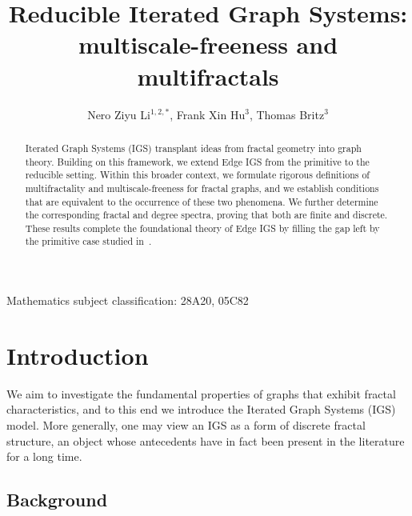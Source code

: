 \documentclass[12pt]{iopart}
\begin{document}
\title[Reducible Iterated Graph Systems]{Reducible Iterated Graph Systems: \\
multiscale-freeness and multifractals}

\author{Nero Ziyu Li$^{1,2,*}$, Frank Xin Hu$^3$, Thomas Britz$^3$}
\address{$^1$ 
Department of Mathematics,
Imperial College London, United Kingdom}
\address{$^2$ CDT Random Systems, University of Oxford, United Kingdom}
\address{$^3$ School of Mathematics and Statistics, UNSW Sydney, Australia}
\address{$^*$ Author to whom any correspondence should be addressed.}


\vspace{0.2cm}\hspace{1.7cm}\small{Mathematics subject classification: 28A20, 05C82}

\begin{abstract}
Iterated Graph Systems (IGS) transplant ideas from fractal geometry into graph theory. 
Building on this framework, we extend Edge IGS from the primitive to the reducible setting. 
Within this broader context, we formulate rigorous definitions of 
multifractality and multiscale-freeness for { fractal graphs}, 
and we establish conditions that are equivalent to the occurrence of these two phenomena. 
We further determine the corresponding fractal and degree spectra, 
proving that both are finite and discrete. 
These results complete the foundational theory of Edge IGS 
by filling the gap left by the primitive case studied in~\cite{li2024scale,neroli2024fractal}.
\end{abstract}









\section{Introduction}
\label{sec:Introduction}

We aim to investigate the fundamental properties of graphs that exhibit fractal characteristics, 
and to this end we introduce the Iterated Graph Systems (IGS) model. 
More generally, one may view an IGS as a form of discrete fractal structure,
an object whose antecedents have in fact been present in the literature for a long time.

\subsection{Background}
\end{document}
